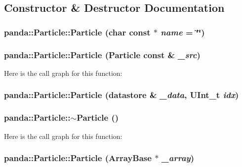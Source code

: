 \subsection{Constructor \& Destructor Documentation}
\hypertarget{classpanda_1_1Particle_a1e3d569b53827f47d15e104e06cca44f}{
\subsubsection[{Particle}]{\setlength{\rightskip}{0pt plus 5cm}panda::Particle::Particle (char const $\ast$ {\em name} = {\ttfamily \char`\"{}\char`\"{}})}}
\label{classpanda_1_1Particle_a1e3d569b53827f47d15e104e06cca44f}
\hypertarget{classpanda_1_1Particle_a1b85ffd9b05ca143d4ed762747fb2b50}{
\subsubsection[{Particle}]{\setlength{\rightskip}{0pt plus 5cm}panda::Particle::Particle ({\bf Particle} const \& {\em \_\-src})}}
\label{classpanda_1_1Particle_a1b85ffd9b05ca143d4ed762747fb2b50}


Here is the call graph for this function:\hypertarget{classpanda_1_1Particle_aeca877b586da802e045c6ed2121240b5}{
\subsubsection[{Particle}]{\setlength{\rightskip}{0pt plus 5cm}panda::Particle::Particle ({\bf datastore} \& {\em \_\-data}, \/  UInt\_\-t {\em idx})}}
\label{classpanda_1_1Particle_aeca877b586da802e045c6ed2121240b5}
\hypertarget{classpanda_1_1Particle_a83e4d1aa75d0c1a125d0b6669bd28db5}{
\subsubsection[{$\sim$Particle}]{\setlength{\rightskip}{0pt plus 5cm}panda::Particle::$\sim$Particle ()}}
\label{classpanda_1_1Particle_a83e4d1aa75d0c1a125d0b6669bd28db5}


Here is the call graph for this function:\hypertarget{classpanda_1_1Particle_a747e6df4d01f0af02a5bafe5d7e66340}{
\subsubsection[{Particle}]{\setlength{\rightskip}{0pt plus 5cm}panda::Particle::Particle ({\bf ArrayBase} $\ast$ {\em \_\-array})}}
\label{classpanda_1_1Particle_a747e6df4d01f0af02a5bafe5d7e66340}


